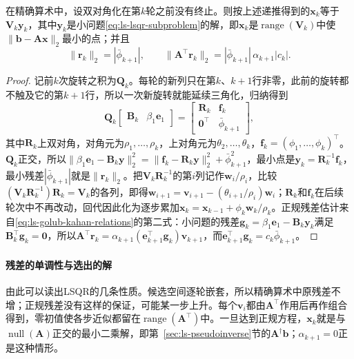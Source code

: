 \begin{theorem}[LSQR递推的正确性]
\label{thm:ls-lsqr-recursion}
在精确算术中，设双对角化在第$k$轮之前没有终止。则按上述递推得到的$\bm x_k$等于$\bm V_k\bm y_k$，其中$\bm y_k$是小问题\eqref{eq:ls-lsqr-subproblem}的解，即$\bm x_k$是$\operatorname{range}(\bm V_k)$中使$\lVert\bm b-\bm A\bm x\rVert_2$最小的点；并且
\[
 \lVert\bm r_k\rVert_2=|\bar\phi_{k+1}|,\qquad
 \lVert\bm A^\top\bm r_k\rVert_2=|\bar\phi_{k+1}|\,\alpha_{k+1}|c_k| .
\]
\end{theorem}

\begin{proof}
记前$k$次旋转之积为$\bm Q_k$。每轮的新列只在第$k$、$k+1$行非零，此前的旋转都不触及它的第$k+1$行，所以一次新旋转就能延续三角化，归纳得到
\[
 \bm Q_k\begin{bmatrix}\bm B_k&\beta_1\bm e_1\end{bmatrix}
 =\begin{bmatrix}\bm R_k&\bm f_k\\ \bm0^\top&\bar\phi_{k+1}\end{bmatrix},
\]
其中$\bm R_k$上双对角，对角元为$\rho_1,\ldots,\rho_k$，上对角元为$\theta_2,\ldots,\theta_k$，$\bm f_k=(\phi_1,\ldots,\phi_k)^\top$。$\bm Q_k$正交，所以$\lVert\beta_1\bm e_1-\bm B_k\bm y\rVert_2^2=\lVert\bm f_k-\bm R_k\bm y\rVert_2^2+\bar\phi_{k+1}^2$，最小点是$\bm y_k=\bm R_k^{-1}\bm f_k$，最小残差$|\bar\phi_{k+1}|$就是$\lVert\bm r_k\rVert_2$。把$\bm V_k\bm R_k^{-1}$的第$i$列记作$\bm w_i/\rho_i$，比较$(\bm V_k\bm R_k^{-1})\bm R_k=\bm V_k$的各列，即得$\bm w_{i+1}=\bm v_{i+1}-(\theta_{i+1}/\rho_i)\bm w_i$；$\bm R_k$和$\bm f_k$在后续轮次中不再改动，回代因此化为逐步累加$\bm x_k=\bm x_{k-1}+\phi_k\bm w_k/\rho_k$。正规残差估计来自\eqref{eq:ls-golub-kahan-relations}的第二式：小问题的残差$\bm g_k=\beta_1\bm e_1-\bm B_k\bm y_k$满足$\bm B_k^\top\bm g_k=\bm0$，所以$\bm A^\top\bm r_k=\alpha_{k+1}(\bm e_{k+1}^\top\bm g_k)\bm v_{k+1}$，而$\bm e_{k+1}^\top\bm g_k=c_k\bar\phi_{k+1}$。
\end{proof}

\paragraph{残差的单调性与选出的解}
由此可以读出LSQR的几条性质。候选空间逐轮嵌套，所以精确算术中原残差不增；正规残差没有这样的保证，可能某一步上升。每个$\bm v_i$都由$\bm A^\top$作用后再作组合得到，零初值使各步近似都留在$\operatorname{range}(\bm A^\top)$中。一旦达到正规方程，$\bm x_k$就是与$\operatorname{null}(\bm A)$正交的最小二乘解，即第~\ref{sec:ls-pseudoinverse}节的$\bm A^\dagger\bm b$；$\alpha_{k+1}=0$正是这种情形。

